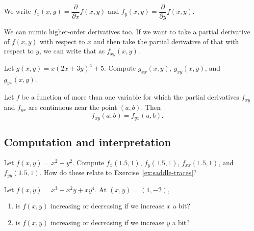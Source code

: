 \vfill\vfill\vfill

\pagebreak

We write $f_x(x,y)=\dfrac{\partial}{\partial x}f(x,y)$ and $f_y(x,y)=\dfrac{\partial}{\partial y}f(x,y)$.

We can mimic higher-order derivatives too. If we want to take a partial derivative of $f(x,y)$ with respect to $x$ and then take the partial derivative of that with respect to $y$, we can write that as $f_{xy}(x,y)$.

\vspace{1.5in}

\begin{ex}
    Let $g(x,y)=x(2x+3y)^4+5$. Compute $g_{xx}(x,y)$, $g_{xy}(x,y)$, and $g_{yx}(x,y)$. %
\end{ex}

\vfill 

\begin{thm}
    Let $f$ be a function of more than one variable for which the partial derivatives $f_{xy}$ and $f_{yx}$ are continuous near the point $(a,b)$. Then
    \[
        f_{xy}(a,b) = f_{yx}(a,b).
    \]
\end{thm}

\vspace{1in}

\pagebreak 

\subsection{Computation and interpretation}
\begin{ex}
    Let $f(x,y)=x^2-y^2$. Compute $f_x(1.5,1)$, $f_y(1.5,1)$, $f_{xx}(1.5,1)$, and $f_{yy}(1.5,1)$. How do these relate to Exercise~\ref{ex:saddle-traces}?
\end{ex}

\vfill

\begin{ex}
    Let $f(x,y)=x^3-x^2y+xy^4$. At $(x,y)=(1,-2)$,
    \begin{enumerate}
        \item is $f(x,y)$ increasing or decreasing if we increase $x$ a bit?
        \item is $f(x,y)$ increasing or decreasing if we increase $y$ a bit?
    \end{enumerate}
\end{ex}

\vfill

